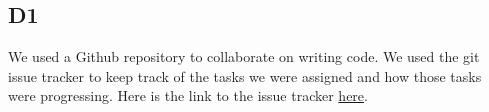 \subsection{D1}
    We used a Github repository to collaborate on writing code. We used the git issue tracker to keep track of the tasks we were assigned and how those tasks were progressing. Here is the link to the issue tracker \href{https://github.com/drlim2u/ELE2024-Control-Coursework/issues}{here}.